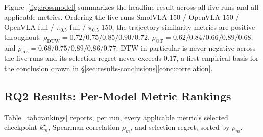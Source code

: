 \documentclass[english,12pt,a4paper,pdftex,elec,utf8]{aaltothesis}
\begin{document}
Figure~\ref{fig:crossmodel} summarizes the headline result across all five runs and all applicable metrics. Ordering the five runs SmolVLA-150 / OpenVLA-150 / OpenVLA-full / $\pi_{0.5}$-full /
$\pi_{0.5}$-150, the trajectory-similarity metrics are positive throughout: $\rho_{\mathrm{DTW}} =
0.72/0.75/0.85/0.90/0.72$, $\rho_{\mathrm{OT}} = 0.62/0.84/0.66/0.89/0.68$, and $\rho_{\cos} =
0.68/0.75/0.89/0.86/0.77$. DTW in particular is never negative across the five runs and its selection
regret never exceeds $0.17$, a first empirical basis for the conclusion drawn in
\S\ref{sec:results-conclusions}\ref{conc:correlation}.

\subsection{RQ2 Results: Per-Model Metric Rankings}
\label{sec:results-permodel}

Table~\ref{tab:rankings} reports, per run, every applicable metric's selected checkpoint $k_m^\star$, Spearman correlation $\rho_m$, and selection regret, sorted by $\rho_m$.
\end{document}

